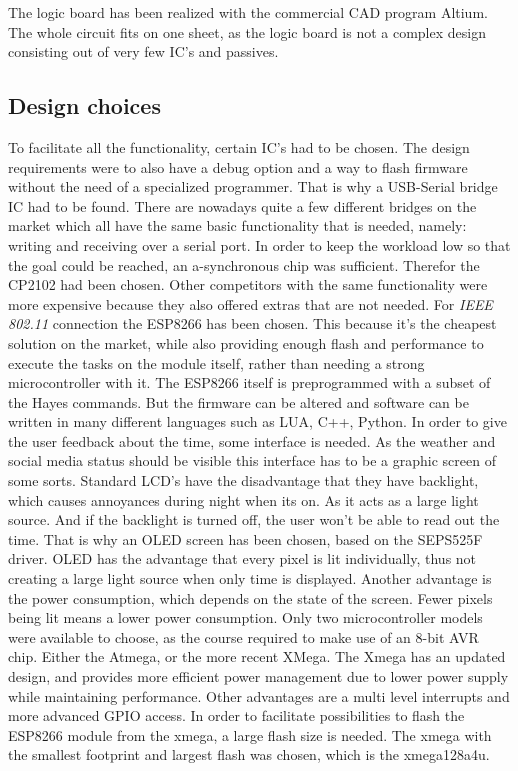 The logic board has been realized with the commercial CAD program Altium. The whole circuit fits on one sheet, as the logic board is not a complex design consisting out of very few IC's and passives. 
\subsection{Design choices}
To facilitate all the functionality, certain IC's had to be chosen. The design requirements were to also have a debug option and a way to flash firmware without the need of a specialized programmer. That is why a USB-Serial bridge IC had to be found. There are nowadays quite a few different bridges on the market which all have the same basic functionality that is needed, namely: writing and receiving over a serial port. In order to keep the workload low so that the goal could be reached, an a-synchronous chip was sufficient. Therefor the CP2102 had been chosen. Other competitors with the same functionality were more expensive because they also offered extras that are not needed.\newpar
For \textit{IEEE 802.11} connection the ESP8266 has been chosen. This because it's the cheapest solution on the market, while also providing enough flash and performance to execute the tasks on the module itself, rather than needing a strong microcontroller with it. The ESP8266 itself is preprogrammed with a subset of the Hayes commands. But the firmware can be altered and software can be written in many different languages such as LUA, C++, Python.\newpar
In order to give the user feedback about the time, some interface is needed. As the weather and social media status should be visible this interface has to be a graphic screen of some sorts. Standard LCD's have the disadvantage that they have backlight, which causes annoyances during night when its on. As it acts as a large light source. And if the backlight is turned off, the user won't be able to read out the time. That is why an OLED screen has been chosen, based on the SEPS525F driver. OLED has the advantage that every pixel is lit individually, thus not creating a large light source when only time is displayed. Another advantage is the power consumption, which depends on the state of the screen. Fewer pixels being lit means a lower power consumption. \newpar
Only two microcontroller models were available to choose, as the course required to make use of an 8-bit AVR chip. Either the Atmega, or the more recent XMega. The Xmega has an updated design, and provides more efficient power management due to lower power supply while maintaining performance. Other advantages are a multi level interrupts and more advanced GPIO access. In order to facilitate possibilities to flash the ESP8266 module from the xmega, a large flash size is needed. The xmega with the smallest footprint and largest flash was chosen, which is the xmega128a4u.

